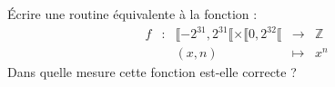 \documentclass[../../../main.tex]{subfiles}
\begin{document}
 Écrire une routine équivalente à la fonction :
 $$
 \begin{array}{lclcl}
f & : & \llbracket-2^{31}, 2^{31}\llbracket\times{\llbracket0, 2^{32}\llbracket}& \rightarrow & \mathbb{Z} \\
& & (x, n) & \mapsto & x^{n}
\end{array}
$$
Dans quelle mesure cette fonction est-elle correcte ?
\end{document}
